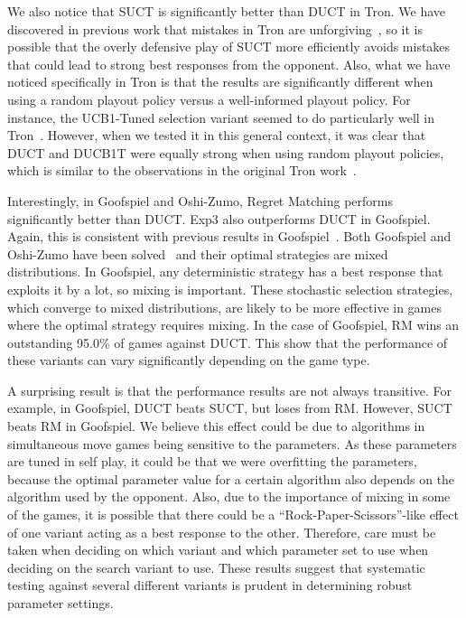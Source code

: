 \documentclass[conference]{IEEEtran}
\begin{document}
We also notice that SUCT is significantly better than DUCT in Tron. We have discovered in previous work that mistakes in
Tron are unforgiving~\cite{Lanctot13Tron}, 
so it is possible that the overly defensive play of SUCT more efficiently avoids mistakes that could lead to strong best responses from the opponent.
Also, what we have noticed specifically in Tron is that the results are significantly different when 
using a random playout policy versus a well-informed playout policy. For instance, the UCB1-Tuned selection variant seemed to do particularly 
well in Tron~\cite{Perick12Comparison,Lanctot13Tron}. However, when we tested it in this general context, it was clear that DUCT and DUCB1T were 
equally strong when using random playout policies, which is similar to the observations in the original Tron work~\cite{Samothrakis10Tron}.

Interestingly, in Goofspiel and Oshi-Zumo, Regret Matching performs significantly better than DUCT. Exp3 also outperforms DUCT in Goofspiel. 
Again, this is consistent with previous results in Goofspiel~\cite{Lanctot13Goofspiel}. Both Goofspiel and Oshi-Zumo have been 
solved~\cite{Buro03OshiZumo,Rhoads12Computer} and their optimal strategies are mixed distributions. In Goofspiel, any deterministic strategy 
has a best response that exploits it by a lot, so mixing is important. These stochastic selection strategies, 
which converge to mixed distributions, are likely to be more effective in games where the optimal strategy requires mixing. 
In the case of Goofspiel, RM wins an outstanding 95.0\% of games against DUCT. This show that the performance of these variants can vary 
significantly depending on the game type. 

A surprising result is that the performance results are not always transitive. For example, in Goofspiel, DUCT beats SUCT, but loses from RM. 
However, SUCT beats RM in Goofspiel. We believe this effect could be due to algorithms in simultaneous move games being
sensitive to the parameters. As these parameters are tuned in self play, it could be that we were overfitting the parameters, because 
the optimal parameter value for a certain algorithm also depends on the algorithm used by the opponent. Also, due to the importance of mixing 
in some of the games, it is possible that there could be a ``Rock-Paper-Scissors''-like effect of one variant acting as a best response to 
the other. Therefore, care must be taken when deciding on which variant and which parameter set to use when deciding on the search variant to 
use. These results suggest that systematic testing against several different variants is prudent in determining robust parameter settings. 
\end{document}
